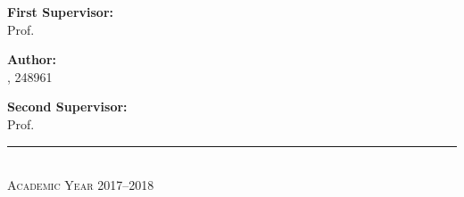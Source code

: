 \begin{titlepage}
\vspace{.075\textheight}

\begin{minipage}[3cm]{.4\textwidth}{\Large
\textbf{First Supervisor:} \\ \smallskip
Prof. \myProf
}
\end{minipage}
\hfill
\begin{minipage}[3cm]{.4\textwidth}{\Large
\hfill	\textbf{Author:} \\ \smallskip
\hfill	\myName, 248961
}
\end{minipage}

\vspace{.02\textheight}

\begin{minipage}[3cm]{.4\textwidth}{\Large
\textbf{Second Supervisor:} \\ \smallskip
Prof. \mySupervisor}
\end{minipage}

\begin{center}
\vfill
\rule{\textwidth}{1pt}\\
{\scshape Academic Year 2017--2018}


\end{center}
\end{titlepage}